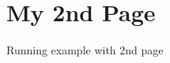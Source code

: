 \chapter{My 2nd Page}
\hypertarget{subpage}{}\label{subpage}
\label{subpage_md__markdown_2test}%
%


Running example with 2nd page 